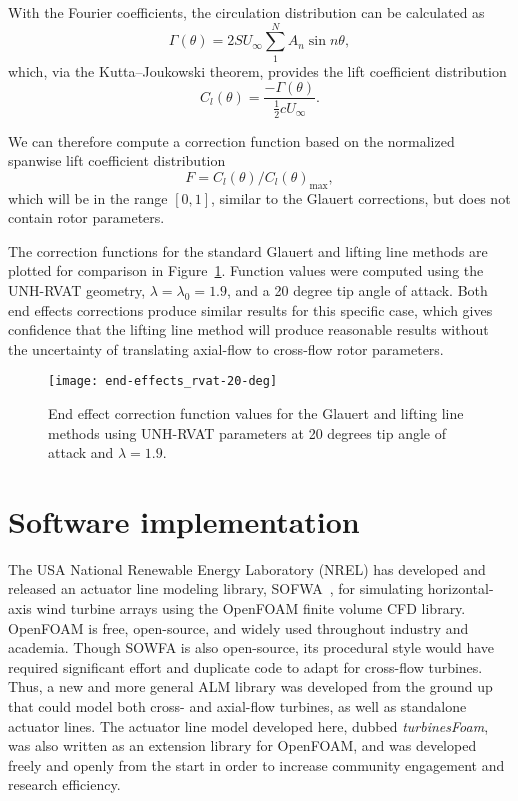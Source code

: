 With the Fourier coefficients, the circulation distribution can be calculated as
\begin{equation}
    \Gamma (\theta) = 2SU_\infty \sum_1^N A_n \sin n \theta,
\end{equation}
which, via the Kutta--Joukowski theorem, provides the lift coefficient
distribution
\begin{equation}
    C_l(\theta) = \frac{-\Gamma (\theta)}{\frac{1}{2} c U_\infty}.
\end{equation}

We can therefore compute a correction function based on the normalized spanwise
lift coefficient distribution
\begin{equation}
    F = C_l(\theta)/C_l(\theta)_{\max},
\end{equation}
which will be in the range $[0, 1]$, similar to the Glauert corrections, but
does not contain rotor parameters. 

The correction functions for the standard Glauert and lifting line methods are
plotted for comparison in Figure~\ref{fig:end-effects}. Function values were
computed using the UNH-RVAT geometry, $\lambda = \lambda_0 = 1.9$, and a 20
degree tip angle of attack. Both end effects corrections produce similar results
for this specific case, which gives confidence that the lifting line method will
produce reasonable results without the uncertainty of translating axial-flow to
cross-flow rotor parameters.

\begin{figure}
    \centering
    
    \texttt{[image: end-effects\_rvat-20-deg]}
    
    \caption{End effect correction function values for the Glauert and lifting
        line methods using UNH-RVAT parameters at 20 degrees tip angle of attack and
        $\lambda=1.9$.}
    
    \label{fig:end-effects}
\end{figure}


\section{Software implementation}

The USA National Renewable Energy Laboratory (NREL) has developed and released
an actuator line modeling library, SOFWA~\cite{Churchfield2014b}, for simulating
horizontal-axis wind turbine arrays using the OpenFOAM finite volume CFD
library. OpenFOAM is free, open-source, and widely used throughout industry and
academia. Though SOWFA is also open-source, its procedural style would have
required significant effort and duplicate code to adapt for cross-flow turbines.
Thus, a new and more general ALM library was developed from the ground up that
could model both cross- and axial-flow turbines, as well as standalone actuator
lines. The actuator line model developed here, dubbed \textit{turbinesFoam}, was
also written as an extension library for OpenFOAM, and was developed freely and
openly from the start in order to increase community engagement and research
efficiency. 

